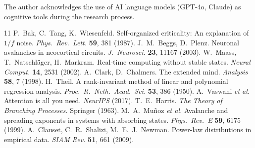 \documentclass[11pt,a4paper,twocolumn]{article}
\begin{document}
The author acknowledges the use of AI language models (GPT-4o, Claude) as cognitive tools during the research process.

\begin{thebibliography}{11}
 P.~Bak, C.~Tang, K.~Wiesenfeld. Self-organized criticality: An explanation of $1/f$ noise. \emph{Phys.\ Rev.\ Lett.} \textbf{59}, 381 (1987).
 J.~M.~Beggs, D.~Plenz. Neuronal avalanches in neocortical circuits. \emph{J.\ Neurosci.} \textbf{23}, 11167 (2003).
 W.~Maass, T.~Natschl\"ager, H.~Markram. Real-time computing without stable states. \emph{Neural Comput.} \textbf{14}, 2531 (2002).
 A.~Clark, D.~Chalmers. The extended mind. \emph{Analysis} \textbf{58}, 7 (1998).
 H.~Theil. A rank-invariant method of linear and polynomial regression analysis. \emph{Proc.\ R.\ Neth.\ Acad.\ Sci.} \textbf{53}, 386 (1950).
 A.~Vaswani \emph{et al.} Attention is all you need. \emph{NeurIPS} (2017).
 T.~E.~Harris. \emph{The Theory of Branching Processes.} Springer (1963).
 M.~A.~Mu\~noz \emph{et al.} Avalanche and spreading exponents in systems with absorbing states. \emph{Phys.\ Rev.\ E} \textbf{59}, 6175 (1999).
 A.~Clauset, C.~R.~Shalizi, M.~E.~J.~Newman. Power-law distributions in empirical data. \emph{SIAM Rev.} \textbf{51}, 661 (2009).
\end{thebibliography}
\end{document}
